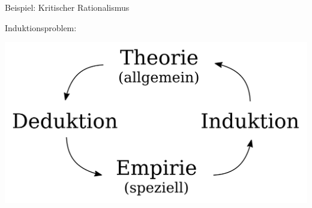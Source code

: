\documentclass{beamer}
\begin{document}
\begin{frame}{Beispiel: Kritischer Rationalismus}

Induktionsproblem:

\centering

\includegraphics[width=\textwidth]{Induktion-Deduktion.svg.png}



\end{frame}
\end{document}
